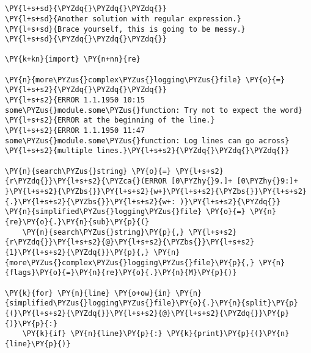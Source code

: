 

\section*{}

\begin{Verbatim}[commandchars=\\\{\}]
\PY{l+s+sd}{\PYZdq{}\PYZdq{}\PYZdq{}}
\PY{l+s+sd}{Another solution with regular expression.}
\PY{l+s+sd}{Brace yourself, this is going to be messy.}
\PY{l+s+sd}{\PYZdq{}\PYZdq{}\PYZdq{}}

\PY{k+kn}{import} \PY{n+nn}{re}

\PY{n}{more\PYZus{}complex\PYZus{}logging\PYZus{}file} \PY{o}{=} \PY{l+s+s2}{\PYZdq{}\PYZdq{}\PYZdq{}}
\PY{l+s+s2}{ERROR 1.1.1950 10:15 some\PYZus{}module.some\PYZus{}function: Try not to expect the word}
\PY{l+s+s2}{ERROR at the beginning of the line.}
\PY{l+s+s2}{ERROR 1.1.1950 11:47 some\PYZus{}module.some\PYZus{}function: Log lines can go across}
\PY{l+s+s2}{multiple lines.}\PY{l+s+s2}{\PYZdq{}\PYZdq{}\PYZdq{}}

\PY{n}{search\PYZus{}string} \PY{o}{=} \PY{l+s+s2}{r\PYZdq{}}\PY{l+s+s2}{\PYZca{}(ERROR [0\PYZhy{}9.]+ [0\PYZhy{}9:]+ }\PY{l+s+s2}{\PYZbs{}}\PY{l+s+s2}{w+}\PY{l+s+s2}{\PYZbs{}}\PY{l+s+s2}{.}\PY{l+s+s2}{\PYZbs{}}\PY{l+s+s2}{w+: )}\PY{l+s+s2}{\PYZdq{}}
\PY{n}{simplified\PYZus{}logging\PYZus{}file} \PY{o}{=} \PY{n}{re}\PY{o}{.}\PY{n}{sub}\PY{p}{(}
    \PY{n}{search\PYZus{}string}\PY{p}{,} \PY{l+s+s2}{r\PYZdq{}}\PY{l+s+s2}{@}\PY{l+s+s2}{\PYZbs{}}\PY{l+s+s2}{1}\PY{l+s+s2}{\PYZdq{}}\PY{p}{,} \PY{n}{more\PYZus{}complex\PYZus{}logging\PYZus{}file}\PY{p}{,} \PY{n}{flags}\PY{o}{=}\PY{n}{re}\PY{o}{.}\PY{n}{M}\PY{p}{)}

\PY{k}{for} \PY{n}{line} \PY{o+ow}{in} \PY{n}{simplified\PYZus{}logging\PYZus{}file}\PY{o}{.}\PY{n}{split}\PY{p}{(}\PY{l+s+s2}{\PYZdq{}}\PY{l+s+s2}{@}\PY{l+s+s2}{\PYZdq{}}\PY{p}{)}\PY{p}{:}
    \PY{k}{if} \PY{n}{line}\PY{p}{:} \PY{k}{print}\PY{p}{(}\PY{n}{line}\PY{p}{)}
\end{Verbatim}
